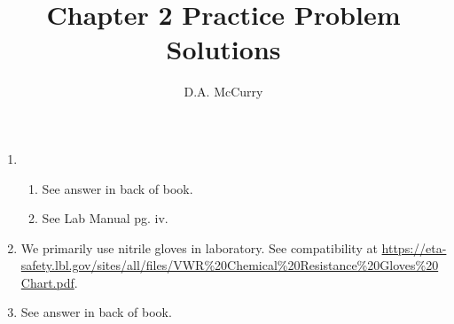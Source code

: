 \documentclass{article}
\title{Chapter 2 Practice Problem Solutions}
\date{}
\author{D.A. McCurry}
\begin{document}
\maketitle

\begin{enumerate}[start=1,leftmargin=0pt]
	\item \begin{enumerate}[label=(\alph*)]
		\item See answer in back of book.
		\item See Lab Manual pg. iv.
	\end{enumerate}
	\item We primarily use nitrile gloves in laboratory. See compatibility
		at
		\url{https://eta-safety.lbl.gov/sites/all/files/VWR%20Chemical%20Resistance%20Gloves%20Chart.pdf}.
	\item See answer in back of book.
\end{enumerate}
\end{document}
